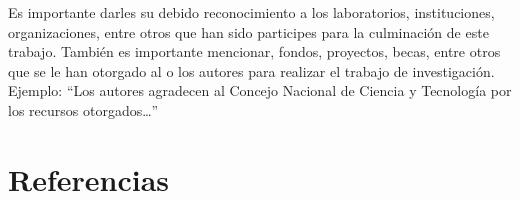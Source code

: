     Es importante darles su debido reconocimiento a los laboratorios, instituciones, organizaciones, entre otros que han sido participes para la culminación de este trabajo. También es importante mencionar, fondos, proyectos, becas, entre otros que se le han otorgado al o los autores para realizar el trabajo de investigación. Ejemplo: “Los autores agradecen al Concejo Nacional de Ciencia y Tecnología por los recursos otorgados…”
    
    \section*{Referencias}
    
    
    
    
